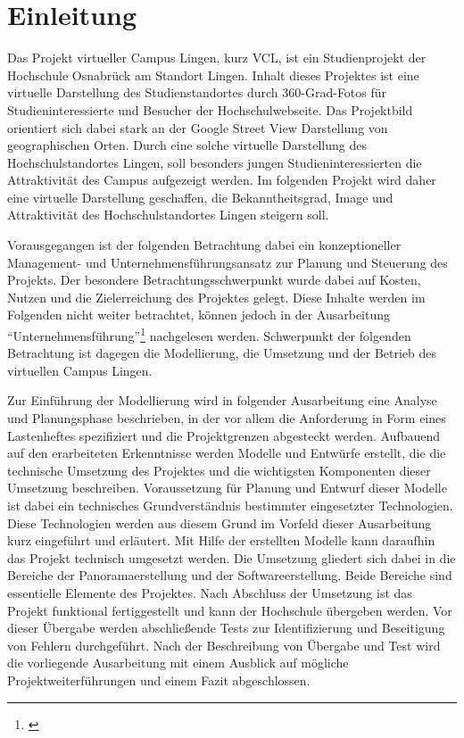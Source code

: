 \section{Einleitung}
\label{sec:Einleitung}

Das Projekt virtueller Campus Lingen, kurz VCL, ist ein Studienprojekt der
Hochschule Osnabrück am Standort Lingen. Inhalt dieses Projektes ist eine
virtuelle Darstellung des Studienstandortes durch 360-Grad-Fotos für
Studieninteressierte und Besucher der Hochschulwebseite. Das Projektbild
orientiert sich dabei stark an der Google Street View Darstellung von
geographischen Orten\footnotemark. Durch eine solche virtuelle Darstellung des
Hochschulstandortes Lingen, soll besonders jungen Studieninteressierten die
Attraktivität des Campus aufgezeigt werden. Im folgenden Projekt wird daher
eine virtuelle Darstellung geschaffen, die Bekanntheitsgrad, Image und
Attraktivität des Hochschulstandortes Lingen steigern soll.


Vorausgegangen ist der folgenden Betrachtung dabei ein konzeptioneller
Management- und Unternehmensführungsansatz zur Planung und Steuerung des
Projekts. Der besondere Betrachtungsschwerpunkt wurde dabei auf Kosten, Nutzen
und die Zielerreichung des Projektes gelegt. Diese Inhalte werden im Folgenden
nicht weiter betrachtet, können jedoch in der Ausarbeitung
"`Unternehmensführung"'\footnote{\citet{unternehmensfuehrung2014}} nachgelesen
werden. Schwerpunkt der folgenden Betrachtung ist dagegen die Modellierung, die
Umsetzung und der Betrieb des virtuellen Campus Lingen.

Zur Einführung der Modellierung wird in folgender Ausarbeitung eine Analyse und
Planungsphase beschrieben, in der vor allem die Anforderung in Form eines
Lastenheftes spezifiziert und die Projektgrenzen abgesteckt werden. Aufbauend
auf den erarbeiteten Erkenntnisse werden Modelle und Entwürfe erstellt, die
die technische Umsetzung des Projektes und die wichtigsten Komponenten dieser
Umsetzung beschreiben. Voraussetzung für Planung und Entwurf dieser Modelle
ist dabei ein technisches Grundverständnis bestimmter eingesetzter Technologien.
Diese Technologien werden aus diesem Grund im Vorfeld dieser Ausarbeitung kurz
eingeführt und erläutert. Mit Hilfe der erstellten Modelle kann daraufhin das
Projekt technisch umgesetzt werden. Die Umsetzung gliedert sich dabei in die
Bereiche der Panoramaerstellung und der Softwareerstellung. Beide Bereiche sind
essentielle Elemente des Projektes.
Nach Abschluss der Umsetzung ist das Projekt funktional fertiggestellt und kann
der Hochschule übergeben werden. Vor dieser Übergabe werden abschließende Tests
zur Identifizierung und Beseitigung von Fehlern durchgeführt.
Nach der Beschreibung von Übergabe und Test wird die vorliegende Ausarbeitung
mit einem Ausblick auf mögliche Projektweiterführungen und einem Fazit
abgeschlossen.
